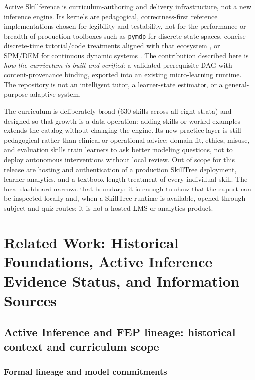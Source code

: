 \documentclass[
  english,
]{article}
\begin{document}
Active Skillference is curriculum-authoring and delivery infrastructure,
not a new inference engine. Its kernels are pedagogical,
correctness-first reference implementations chosen for legibility and
testability, not for the performance or breadth of production toolboxes
such as \texttt{pymdp} for discrete state spaces, concise discrete-time
tutorial/code treatments aligned with that ecosystem
\citep{heins2022pymdp, vanoostrum2025concise}, or SPM/DEM for continuous
dynamic systems \citep{friston2007variational, friston2008dem}. The
contribution described here is \emph{how the curriculum is built and
verified}: a validated prerequisite DAG with content-provenance binding,
exported into an existing micro-learning runtime. The repository is not
an intelligent tutor, a learner-state estimator, or a general-purpose
adaptive system.

The curriculum is deliberately broad (630 skills across all eight
strata) and designed so that growth is a data operation: adding skills
or worked examples extends the catalog without changing the engine. Its
new practice layer is still pedagogical rather than clinical or
operational advice: domain-fit, ethics, misuse, and evaluation skills
train learners to ask better modeling questions, not to deploy
autonomous interventions without local review. Out of scope for this
release are hosting and authentication of a production SkillTree
deployment, learner analytics, and a textbook-length treatment of every
individual skill. The local dashboard narrows that boundary: it is
enough to show that the export can be inspected locally and, when a
SkillTree runtime is available, opened through subject and quiz routes;
it is not a hosted LMS or analytics product.

\newpage

\section{Related Work: Historical Foundations, Active Inference Evidence
Status, and Information
Sources}\label{sec:related-work-aif-information-sources}

\subsection{Active Inference and FEP lineage: historical context and
curriculum
scope}\label{active-inference-and-fep-lineage-historical-context-and-curriculum-scope}

\subsubsection{Formal lineage and model
commitments}\label{formal-lineage-and-model-commitments}
\end{document}
